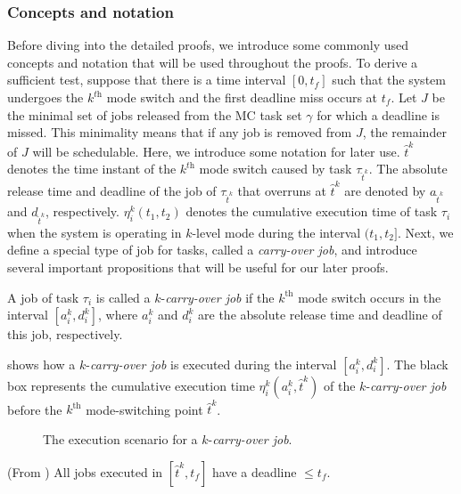 \documentclass[10pt,journal,compsoc]{IEEEtran}
\begin{document}
\subsubsection{\textbf{Concepts and notation}}
Before diving into the detailed proofs, we introduce some commonly used concepts and notation that will be used throughout the proofs. To derive a sufficient test, suppose that there is a time interval $[0, t_f]$ such that the system undergoes the $k^{\textit{th}}$ mode switch and the first deadline miss occurs at $t_f$. Let $J$ be the minimal set of jobs released from the MC task set $\gamma$ for which a deadline is missed. This minimality means that if any job is removed from $J$, the remainder of $J$ will be schedulable. Here, we introduce some notation for later use. $\hat{t}^k$ denotes the time instant of the $k^{\textit{th}}$ mode switch caused by \hi task $\tau_{\hat{t}^k}$. The absolute release time and deadline of the job of $\tau_{\hat{t}^k}$ that overruns at $\hat{t}^k$ are denoted by $a_{\hat{t}^k}$ and $d_{\hat{t}^k}$, respectively. $\eta_i^k(t_1,t_2)$ denotes the cumulative execution time of task $\tau_i$ when the system is operating in $k$-level \hi mode during the interval $(t_1, t_2]$. Next, we define a special type of job for \lo tasks, called a \textit{carry-over job}, and introduce several important propositions that will be useful for our later proofs.
\begin{definition}
\label{definition:k_carry_over_job}
A job of \lo task $\tau_i$ is called a $k$-\textit{carry-over job} if the $k^{\text{th}}$ mode switch occurs in the interval $[a_i^k,d_i^k]$, where $a_i^k$ and $d_i^k$ are the absolute release time and deadline of this job, respectively.
\end{definition} 
 shows how a $k$-\textit{carry-over job} is executed during the interval $[a_i^k,d_i^{k}]$. The black box represents the cumulative execution time $\eta_i^k(a_i^k,\hat{t}^{k})$ of the $k$-\textit{carry-over job} before the $k^{\text{th}}$ mode-switching point $\hat{t}^{k}$. 

\begin{figure}[t]
  \centering 
  \scalebox{1}{}
  \caption{The execution scenario for a $k$-\textit{carry-over job}.}
  \label{fig:prop}
\end{figure} 

\begin{proposition}
\label{prop:x}
(From \cite{Baruah2012,sanjoyACM}) 
All jobs executed in $[\hat{t}^k,t_f]$ have a deadline $\le{}t_f$.
\end{proposition}
\end{document}
